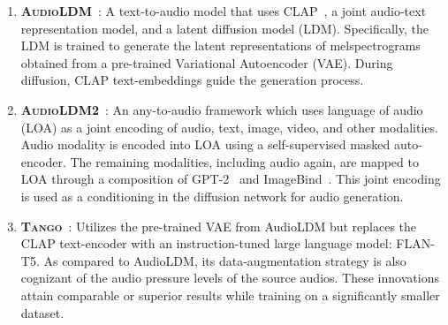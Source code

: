\begin{enumerate}[leftmargin=0.75cm]
    \item \textsc{\bf AudioLDM}~\cite{liu2023audioldm}: A text-to-audio model that uses CLAP~\cite{wu2023large}, a joint audio-text representation model, and a latent diffusion model (LDM). Specifically, the LDM is trained to generate the latent representations of melspectrograms obtained from a pre-trained Variational Autoencoder (VAE). During diffusion, CLAP text-embeddings guide the generation process.
    
    \item \textsc{\bf AudioLDM2}~\cite{liu2023audioldm2}: An any-to-audio framework which uses language of audio (LOA) as a joint encoding of audio, text, image, video, and other modalities. Audio modality is encoded into LOA using a self-supervised masked auto-encoder. The remaining modalities, including audio again, are mapped to LOA through a composition of GPT-2~\cite{radford2019language} and ImageBind~\cite{girdhar2023imagebind}. This joint encoding is used as a conditioning in the diffusion network for audio generation.
    
    \item \textsc{\bf Tango}~\cite{ghosal2023text}: Utilizes the pre-trained VAE from AudioLDM but replaces the CLAP text-encoder with an instruction-tuned large language model: FLAN-T5. As compared to AudioLDM, its data-augmentation strategy is also cognizant of the audio pressure levels of the source audios. These innovations attain comparable or superior results while training on a significantly smaller dataset.
\end{enumerate}

